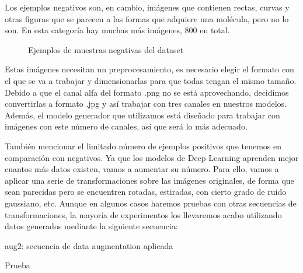 Los ejemplos negativos son, en cambio, imágenes que contienen rectas, curvas y otras figuras que se parecen a las formas que adquiere una molécula, pero no lo son. En esta categoría hay muchas más imágenes, 800 en total.

\begin{figure}[H]
\centering
    \caption{Ejemplos de muestras negativas del dataset} 
\end{figure}

Estas imágenes necesitan un preprocesamiento, es necesario elegir el formato con el que se va a trabajar y dimensionarlas para que todas tengan el mismo tamaño. Debido a que el canal alfa del formato .png no se está aprovechando, decidimos convertirlas a formato .jpg y así trabajar con tres canales en nuestros modelos. Además, el modelo generador que utilizamos está diseñado para trabajar con imágenes con este número de canales, así que será lo más adecuado.

También mencionar el limitado número de ejemplos positivos que tenemos en comparación con negativos. Ya que los modelos de Deep Learning aprenden mejor cuantos más datos existen, vamos a aumentar su número. Para ello, vamos a aplicar una serie de transformaciones sobre las imágenes originales, de forma que sean parecidas pero se encuentren rotadas, estiradas, con cierto grado de ruido gaussiano, etc. Aunque en algunos casos haremos pruebas con otras secuencias de transformaciones, la mayoría de experimentos los llevaremos acabo utilizando datos generados mediante la siguiente secuencia:

\begin{algorithm}[H]
    \caption{aug2: secuencia de data augmentation aplicada }
\begin{algorithmic}
    \State Prueba
\end{algorithmic}
\end{algorithm}



